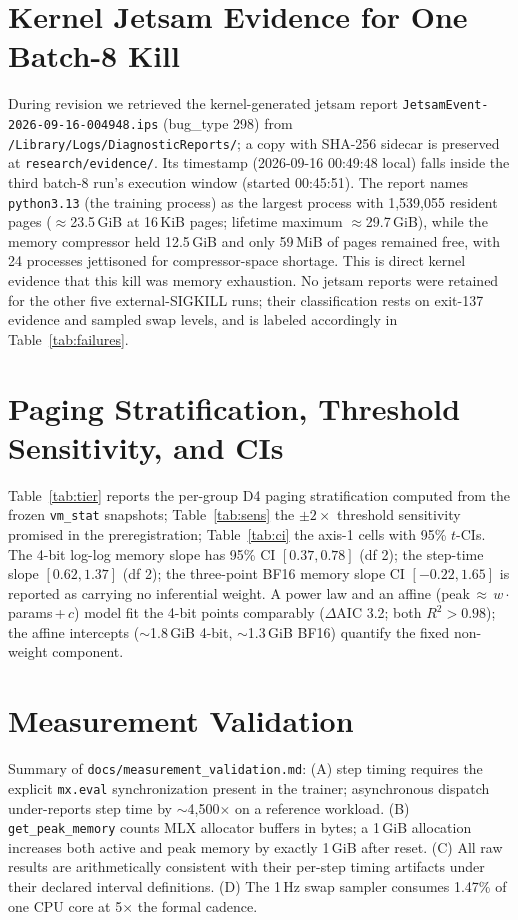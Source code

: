 \documentclass[10pt,twocolumn]{article}
\begin{document}
\section{Kernel Jetsam Evidence for One Batch-8 Kill}
\label{app:jetsam}
During revision we retrieved the kernel-generated jetsam report
\texttt{JetsamEvent-2026-09-16-004948.ips} (bug\_type 298) from
\texttt{/Library/Logs/DiagnosticReports/}; a copy with SHA-256
sidecar is preserved at \texttt{research/evidence/}. Its timestamp
(2026-09-16 00:49:48 local) falls inside the third batch-8 run's
execution window (started 00:45:51). The report names
\texttt{python3.13} (the training process) as the largest process
with 1{,}539{,}055 resident pages ($\approx$23.5\,GiB at 16\,KiB
pages; lifetime maximum $\approx$29.7\,GiB), while the memory
compressor held 12.5\,GiB and only 59\,MiB of pages remained free,
with 24 processes jettisoned for compressor-space shortage. This is
direct kernel evidence that this kill was memory exhaustion. No
jetsam reports were retained for the other five external-SIGKILL
runs; their classification rests on exit-137 evidence and sampled
swap levels, and is labeled accordingly in Table~\ref{tab:failures}.

\section{Paging Stratification, Threshold Sensitivity, and CIs}
\label{app:stratify}
Table~\ref{tab:tier} reports the per-group D4 paging stratification
computed from the frozen \texttt{vm\_stat} snapshots;
Table~\ref{tab:sens} the $\pm2\times$ threshold sensitivity promised
in the preregistration; Table~\ref{tab:ci} the axis-1 cells with
95\% $t$-CIs. The 4-bit log-log memory slope has 95\% CI $[0.37,0.78]$
(df 2); the step-time slope $[0.62,1.37]$ (df 2); the three-point
BF16 memory slope CI $[-0.22,1.65]$ is reported as carrying no
inferential weight. A power law and an affine
(peak\,$\approx$\,$w\cdot$params\,+\,$c$) model fit the 4-bit points
comparably ($\Delta$AIC 3.2; both $R^2>0.98$); the affine intercepts
($\sim$1.8\,GiB 4-bit, $\sim$1.3\,GiB BF16) quantify the fixed
non-weight component.





\section{Measurement Validation}
\label{app:measurements}
Summary of \texttt{docs/measurement\_validation.md}: (A) step timing requires
the explicit \texttt{mx.eval} synchronization present in the trainer;
asynchronous dispatch under-reports step time by $\sim$4{,}500$\times$ on a
reference workload. (B) \texttt{get\_peak\_memory} counts MLX allocator
buffers in bytes; a 1\,GiB allocation increases both active and peak memory by
exactly 1\,GiB after reset. (C) All raw results are arithmetically consistent
with their per-step timing artifacts under their declared interval
definitions. (D) The 1\,Hz swap sampler consumes 1.47\% of one CPU core at
5$\times$ the formal cadence.
\end{document}

